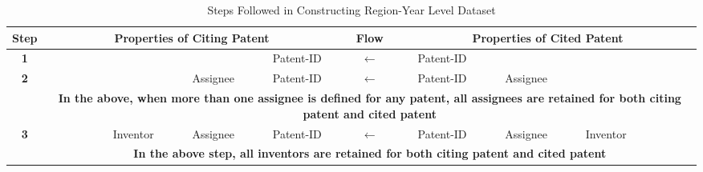 \begin{sidewaystable}[htbp]\centering
\caption{Steps Followed in Constructing Region-Year Level Dataset \label{DataFlow}}
\small
\begin{tabular}{|c|c|c|c|c|c|c|c|c|c|c|c|c|c|}
\toprule
\textbf{Step} & \multicolumn{6}{c|}{\cellcolor[rgb]{ .988,  .894,  .839}\textbf{Properties of Citing Patent}} & \textbf{Flow} & \multicolumn{6}{c|}{\cellcolor[rgb]{ .741,  .843,  .933}\textbf{Properties of Cited Patent}} \\
\midrule
\textbf{1} & \cellcolor[rgb]{ .988,  .894,  .839} & \cellcolor[rgb]{ .988,  .894,  .839} & \cellcolor[rgb]{ .988,  .894,  .839} & \cellcolor[rgb]{ .988,  .894,  .839} & \cellcolor[rgb]{ .988,  .894,  .839} & \cellcolor[rgb]{ .988,  .894,  .839}Patent-ID & \textbf{$\leftarrow$} & \cellcolor[rgb]{ .741,  .843,  .933}Patent-ID & \cellcolor[rgb]{ .741,  .843,  .933} & \cellcolor[rgb]{ .741,  .843,  .933} & \cellcolor[rgb]{ .741,  .843,  .933} & \cellcolor[rgb]{ .741,  .843,  .933} & \cellcolor[rgb]{ .741,  .843,  .933} \\
\midrule
\textbf{2} & \cellcolor[rgb]{ .988,  .894,  .839} & \cellcolor[rgb]{ .988,  .894,  .839} & \cellcolor[rgb]{ .988,  .894,  .839} & \cellcolor[rgb]{ .988,  .894,  .839} & \cellcolor[rgb]{ .988,  .894,  .839}Assignee & \cellcolor[rgb]{ .988,  .894,  .839}Patent-ID & \textbf{$\leftarrow$} & \cellcolor[rgb]{ .741,  .843,  .933}Patent-ID & \cellcolor[rgb]{ .741,  .843,  .933}Assignee & \cellcolor[rgb]{ .741,  .843,  .933} & \cellcolor[rgb]{ .741,  .843,  .933} & \cellcolor[rgb]{ .741,  .843,  .933} & \cellcolor[rgb]{ .741,  .843,  .933} \\
\midrule
& \multicolumn{13}{c|}{\cellcolor[rgb]{ .886,  .937,  .855}\textbf{In the above, when more than one assignee is defined for any patent, all assignees are retained for both citing patent and cited patent}} \\
\midrule
\textbf{3} & \cellcolor[rgb]{ .988,  .894,  .839} & \cellcolor[rgb]{ .988,  .894,  .839} & \cellcolor[rgb]{ .988,  .894,  .839} & \cellcolor[rgb]{ .988,  .894,  .839}Inventor & \cellcolor[rgb]{ .988,  .894,  .839}Assignee & \cellcolor[rgb]{ .988,  .894,  .839}Patent-ID & \textbf{$\leftarrow$} & \cellcolor[rgb]{ .741,  .843,  .933}Patent-ID & \cellcolor[rgb]{ .741,  .843,  .933}Assignee & \cellcolor[rgb]{ .741,  .843,  .933}Inventor & \cellcolor[rgb]{ .741,  .843,  .933} & \cellcolor[rgb]{ .741,  .843,  .933} & \cellcolor[rgb]{ .741,  .843,  .933} \\
\midrule
& \multicolumn{13}{c|}{\cellcolor[rgb]{ .886,  .937,  .855}\textbf{In the above step, all inventors are retained for both citing patent and cited patent}} \\

\end{tabular}
\end{sidewaystable}

